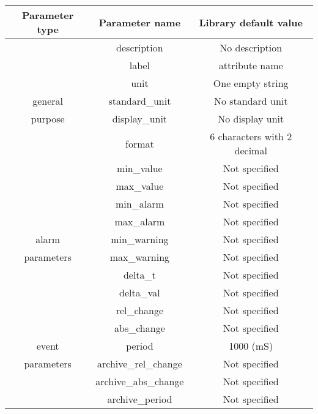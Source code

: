 \vspace{0.3cm}

\begin{center}
\begin{longtable}{|c|c|c|}
\hline 
Parameter type & Parameter name & Library default value\tabularnewline
\hline 
\hline 
 & description & \textquotedbl{}No description\textquotedbl{}\tabularnewline
\cline{2-3} 
\multicolumn{1}{|c|}{} & label & attribute name\tabularnewline
\cline{2-3} 
\multicolumn{1}{|c|}{} & unit & One empty string\tabularnewline
\cline{2-3} 
\multicolumn{1}{|c|}{general} & standard\_unit & \textquotedbl{}No standard unit\textquotedbl{}\tabularnewline
\cline{2-3} 
\multicolumn{1}{|c|}{purpose} & display\_unit & \textquotedbl{}No display unit\textquotedbl{}\tabularnewline
\cline{2-3} 
\multicolumn{1}{|c|}{} & format & 6 characters with 2 decimal\tabularnewline
\cline{2-3} 
\multicolumn{1}{|c|}{} & min\_value & \textquotedbl{}Not specified\textquotedbl{}\tabularnewline
\cline{2-3} 
\multicolumn{1}{|c|}{} & max\_value & \textquotedbl{}Not specified\textquotedbl{}\tabularnewline
\hline 
\multicolumn{1}{|c|}{} & min\_alarm & \textquotedbl{}Not specified\textquotedbl{}\tabularnewline
\cline{2-3} 
\multicolumn{1}{|c|}{} & max\_alarm & \textquotedbl{}Not specified\textquotedbl{}\tabularnewline
\cline{2-3} 
\multicolumn{1}{|c|}{alarm } & min\_warning & \textquotedbl{}Not specified\textquotedbl{}\tabularnewline
\cline{2-3} 
\multicolumn{1}{|c|}{parameters} & max\_warning & \textquotedbl{}Not specified\textquotedbl{}\tabularnewline
\cline{2-3} 
\multicolumn{1}{|c|}{} & delta\_t & \textquotedbl{}Not specified\textquotedbl{}\tabularnewline
\cline{2-3} 
\multicolumn{1}{|c|}{} & delta\_val & \textquotedbl{}Not specified\textquotedbl{}\tabularnewline
\hline 
\multicolumn{1}{|c|}{} & rel\_change & \textquotedbl{}Not specified\textquotedbl{}\tabularnewline
\cline{2-3} 
\multicolumn{1}{|c|}{} & abs\_change & \textquotedbl{}Not specified\textquotedbl{}\tabularnewline
\cline{2-3} 
\multicolumn{1}{|c|}{event} & period & 1000 (mS)\tabularnewline
\cline{2-3} 
\multicolumn{1}{|c|}{parameters} & archive\_rel\_change & \textquotedbl{}Not specified\textquotedbl{}\tabularnewline
\cline{2-3} 
\multicolumn{1}{|c|}{} & archive\_abs\_change & \textquotedbl{}Not specified\textquotedbl{}\tabularnewline
\cline{2-3} 
\multicolumn{1}{|c|}{} & archive\_period & \textquotedbl{}Not specified\textquotedbl{}\tabularnewline
\hline 
\end{longtable}
\par\end{center}

